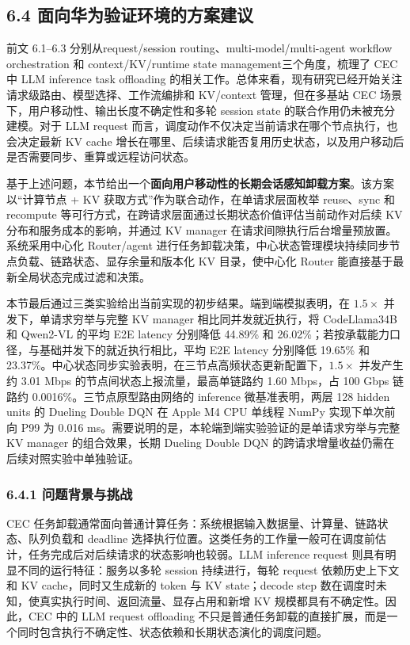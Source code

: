 \subsection*{6.4 面向华为验证环境的方案建议}

前文 6.1--6.3 分别从request/\allowbreak session routing、multi-model/\allowbreak multi-agent workflow orchestration 和 context/\allowbreak KV/\allowbreak runtime state management三个角度，梳理了 CEC 中 LLM inference task offloading 的相关工作。总体来看，现有研究已经开始关注请求级路由、模型选择、工作流编排和 KV/context 管理，但在多基站 CEC 场景下，用户移动性、输出长度不确定性和多轮 session state 的联合作用仍未被充分建模。对于 LLM request 而言，调度动作不仅决定当前请求在哪个节点执行，也会决定最新 KV cache 增长在哪里、后续请求能否复用历史状态，以及用户移动后是否需要同步、重算或远程访问状态。

基于上述问题，本节给出一个\textbf{面向用户移动性的长期会话感知卸载方案}。该方案以“计算节点 + KV 获取方式”作为联合动作，在单请求层面枚举 reuse、sync 和 recompute 等可行方式，在跨请求层面通过长期状态价值评估当前动作对后续 KV 分布和服务成本的影响，并通过 KV manager 在请求间隙执行后台增量预放置。系统采用中心化 Router/agent 进行任务卸载决策，中心状态管理模块持续同步节点负载、链路状态、显存余量和版本化 KV 目录，使中心化 Router 能直接基于最新全局状态完成过滤和决策。

本节最后通过三类实验给出当前实现的初步结果。端到端模拟表明，在 \(1.5\times\) 并发下，单请求穷举与完整 KV manager 相比同并发就近执行，将 CodeLlama34B 和 Qwen2-VL 的平均 E2E latency 分别降低 44.89\% 和 26.02\%；若按承载能力口径，与基础并发下的就近执行相比，平均 E2E latency 分别降低 19.65\% 和 23.37\%。中心状态同步实验表明，在三节点高频状态更新配置下，\(1.5\times\) 并发产生约 3.01 Mbps 的节点间状态上报流量，最高单链路约 1.60 Mbps，占 100 Gbps 链路约 0.0016\%。三节点原型路由网络的 inference 微基准表明，两层 128 hidden units 的 Dueling Double DQN 在 Apple M4 CPU 单线程 NumPy 实现下单次前向 P99 为 0.016 ms。需要说明的是，本轮端到端实验验证的是单请求穷举与完整 KV manager 的组合效果，长期 Dueling Double DQN 的跨请求增量收益仍需在后续对照实验中单独验证。

\subsubsection*{6.4.1 问题背景与挑战}

CEC 任务卸载通常面向普通计算任务：系统根据输入数据量、计算量、链路状态、队列负载和 deadline 选择执行位置。这类任务的工作量一般可在调度前估计，任务完成后对后续请求的状态影响也较弱。LLM inference request 则具有明显不同的运行特征：服务以多轮 session 持续进行，每轮 request 依赖历史上下文和 KV cache，同时又生成新的 token 与 KV state；decode step 数在调度时未知，使真实执行时间、返回流量、显存占用和新增 KV 规模都具有不确定性。因此，CEC 中的 LLM request offloading 不只是普通任务卸载的直接扩展，而是一个同时包含执行不确定性、状态依赖和长期状态演化的调度问题。

